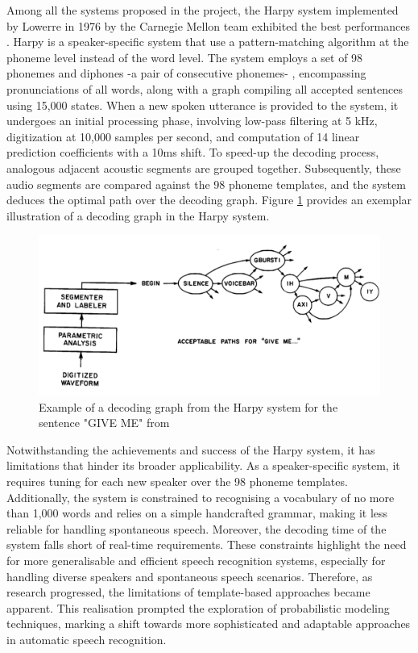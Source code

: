 Among all the systems proposed in the project, the Harpy system implemented by Lowerre in 1976 by the Carnegie Mellon team exhibited the best performances \cite{klatt1977review}. Harpy is a speaker-specific system that use a pattern-matching algorithm at the phoneme level instead of the word level. The system employs a set of 98 phonemes and diphones -a pair of consecutive phonemes- , encompassing pronunciations of all words, along with a graph compiling all accepted sentences using 15,000 states. When a new spoken utterance is provided to the system, it undergoes an initial processing phase, involving low-pass filtering at 5 kHz, digitization at 10,000 samples per second, and computation of 14 linear prediction coefficients with a 10ms shift. To speed-up the decoding process, analogous adjacent acoustic segments are grouped together. Subsequently, these audio segments are compared against the 98 phoneme templates, and the system deduces the optimal path over the decoding graph. Figure \ref{harpy} provides an exemplar illustration of a decoding graph in the Harpy system.


\begin{figure}[h]
\includegraphics[width=\textwidth]{imgs/harpy.png}
\caption{Example of a decoding graph from the Harpy system for the sentence "GIVE ME" from \cite{klatt1977review}}
\label{harpy}
\end{figure}

Notwithstanding the achievements and success of the Harpy system, it has limitations that hinder its broader applicability. As a speaker-specific system, it requires tuning for each new speaker over the 98 phoneme templates. Additionally, the system is constrained to recognising a vocabulary of no more than 1,000 words and relies on a simple handcrafted grammar, making it less reliable for handling spontaneous speech. Moreover, the decoding time of the system falls short of real-time requirements. These constraints highlight the need for more generalisable and efficient speech recognition systems, especially for handling diverse speakers and spontaneous speech scenarios. Therefore, as research progressed, the limitations of template-based approaches became apparent. This realisation prompted the exploration of probabilistic modeling techniques, marking a shift towards more sophisticated and adaptable approaches in automatic speech recognition. 


